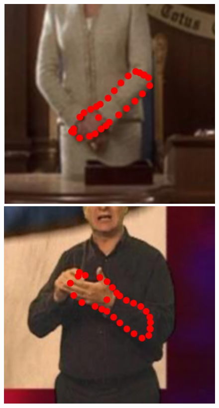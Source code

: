 \begin{figure}
    \includegraphics[height=\ofh]{resources/Annotation_Correction/Suplementory_Meterial/ExFit/0039}
    \hfill
    \includegraphics[height=\ofh]{resources/Annotation_Correction/Suplementory_Meterial/ExFit/0040}
    \hfill

\end{figure}
